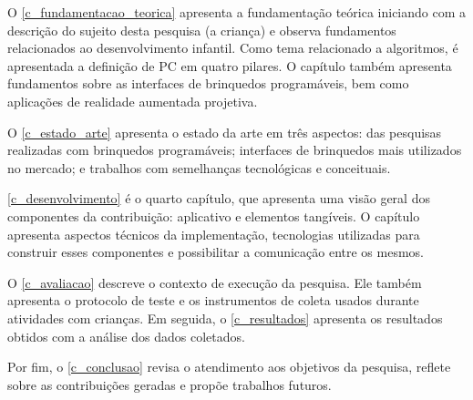 O \autoref{c_fundamentacao_teorica} apresenta a fundamentação teórica iniciando com a descrição do sujeito desta pesquisa (a criança) e observa fundamentos relacionados ao desenvolvimento infantil. Como tema relacionado a algoritmos, é apresentada a definição de \ac{PC} em quatro pilares. O capítulo também apresenta fundamentos sobre as interfaces de brinquedos programáveis, bem como aplicações de realidade aumentada projetiva.

O \autoref{c_estado_arte} apresenta o estado da arte em três aspectos: das pesquisas realizadas com brinquedos programáveis; interfaces de brinquedos mais utilizados no mercado; e trabalhos com semelhanças tecnológicas e conceituais.

\autoref{c_desenvolvimento} é o quarto capítulo, que apresenta uma visão geral dos componentes da contribuição: aplicativo e elementos tangíveis. O capítulo apresenta aspectos técnicos da implementação, tecnologias utilizadas para construir esses componentes e possibilitar a comunicação entre os mesmos.

O \autoref{c_avaliacao} descreve o contexto de execução da pesquisa. Ele também apresenta o protocolo de teste e os instrumentos de coleta usados durante atividades com crianças. Em seguida, o \autoref{c_resultados} apresenta os resultados obtidos com a análise dos dados coletados.

Por fim, o \autoref{c_conclusao} revisa o atendimento aos objetivos da pesquisa, reflete sobre as contribuições geradas e propõe trabalhos futuros.